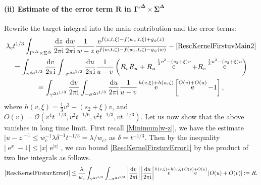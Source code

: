 \documentclass[cmp]{svjour}
\numberwithin{theorem}{section}
\numberwithin{equation}{section}
\DeclareMathOperator{\e}{e}
\def\ii{{\rm i}}
\begin{document}
\paragraph{(ii) Estimate of the error term $\boldsymbol{R}$ in $\boldsymbol{\Gamma'^{\Delta} \times \Sigma^{\Delta}}$}
Rewrite the target integral into the main contribution and the error terms:
\begin{multline}\label{RescKernelFirstuvError1}
	\lambda_c t^{1/3} \int_{{\Gamma'}^{\Delta } \times {\Sigma}^{\Delta }} \frac{\mathrm{d} z}{2 \pi \ii} \frac{\mathrm{d} w}{2 \pi \ii} \frac{1}{ w-z}  \frac{ \mathrm{e}^{ f(z, t,\xi) - f(w_c , t, \xi) + g_{\phi}(z)} }{ \mathrm{e}^{ f(w, t,\zeta) - f(w_c , t, \zeta) - g_{\psi}(w)}  } - \eqref{RescKernelFirstuvMain2} \\
	= \int_{\gamma^{\Delta t^{1/3}}} \frac{\mathrm{d} v}{2 \pi \ii}  \int_{ -\sigma^{\Delta t^{1/3}}} \frac{\mathrm{d} u}{2 \pi \ii} \frac{1}{u-v} \left(
	R_vR_u + R_u \e^{\frac{1}{3} v^3 - (s_2 + \xi ) v} + R_v \e^{\frac{1}{3} u^3 - (s_2 + \xi ) u} 
	\right) \\
	= \int_{\gamma^{\Delta t^{1/3}}} \frac{\mathrm{d} v}{2 \pi \ii}  \int_{ -\sigma^{\Delta t^{1/3}}} \frac{\mathrm{d} u}{2 \pi \ii} \frac{1}{u-v}  \e^{h(v,\xi) + h(u,\zeta)} 
	\left[
	\e^{ O(v) + O(u) } - 1
	\right],
\end{multline}
where  $h(v,\xi)=\frac{1}{3} v^3 - (s_2 + \xi ) v$, and $O(v)=\mathcal{O}( v^4 t^{-1/3} , v^2 t^{-1/6} , v^2 t^{-1/3} , v t^{-1/3} )$. Let us now show that the above vanishes in long time limit. First recall \eqref{Minimum|w-z|}, we 
have the estimate $|u-z|^{-1} \leq w_c^{-1} \lambda \delta^{-1} t^{-1/3} = \lambda / w_c$, as $\delta = t^{-1/3}$. Then by the inequality $|\e^x - 1| \leq |x| \e^{|x|}$, we can bound \eqref{RescKernelFirstuvError1} by the product of two line integrals as follows.
\begin{equation}\label{RescKernelErrorR}
	\eqref{RescKernelFirstuvError1} \leq \frac{\lambda}{w_c} \int_{\gamma^{\Delta t^{1/3}}}  \int_{ -\sigma^{\Delta t^{1/3}}} \left|\frac{\mathrm{d} v}{2 \pi \ii} \right| \left|\frac{\mathrm{d} u}{2 \pi \ii} \right|
	\e^{h(v,\xi) + h(u,\zeta)} 
	\e^{ O(v) + O(u) }
	\left|O(u) + O(v) \right| := R.
\end{equation}
\end{document}
